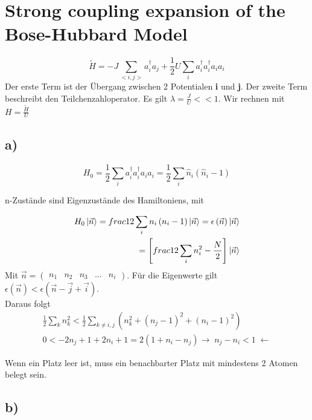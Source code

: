 \section{Strong coupling expansion of the Bose-Hubbard Model}

\begin{equation}
\tilde{H} = -J \sum_{<i,j>} a_i^{\dagger} a_j + \frac{1}{2} U \sum_i a_i^{\dagger} a_i^{\dagger} a_i a_i
\end{equation}
Der erste Term ist der \"Ubergang zwischen 2 Potentialen \textbf{i} und \textbf{j}. Der zweite Term beschreibt den Teilchenzahloperator. Es gilt $\lambda = \frac{J}{U} << 1$. Wir rechnen mit $H = \frac{\tilde{H}}{U}$

\subsection{a)}

\begin{equation}
H_0 = \frac{1}{2} \sum_i a_i^{\dagger} a_i^{\dagger} a_i a_i = \frac{1}{2} \sum_i \hat{n}_i \left( \hat{n}_i - 1 \right)
\end{equation}

n-Zust\"ande sind Eigenzust\"ande des Hamiltoniens, mit

\begin{align}
H_0 \Ket{\vec{n}} = frac{1}{2} \sum_i n_i \left( n_i - 1 \right) \Ket{\vec{n}} = \epsilon \left( \vec{n} \right) \Ket{\vec{n}} \\
= \left[ frac{1}{2} \sum_i n_i^2 - \frac{N}{2} \right] \Ket{\vec{n}}
\end{align}
Mit $\vec{n} = \begin{pmatrix} n_1 & n_2 & n_3 & ... & n_i \end{pmatrix}$. F\"ur die Eigenwerte gilt $ \epsilon \left( \vec{n} \right) < \epsilon \left( \vec{n} -\vec{j} + \vec{i} \right)$. \\

Daraus folgt
\begin{align}
\frac{1}{2} \sum_k n_k^2 < \frac{1}{2} \sum_{k \neq i,j} \left( n_k^2 + \left(n_j -1 \right)^2 + \left(n_i -1 \right)^2 \right) \\
0 < -2 n_j + 1 + 2n_i +1 = 2 \left( 1 + n_i - n_j \right)
\rightarrow \; n_j - n_i < 1 \; \leftarrow
\end{align}

Wenn ein Platz leer ist, muss ein benachbarter Platz mit mindestens 2 Atomen belegt sein.

\subsection{b)}

